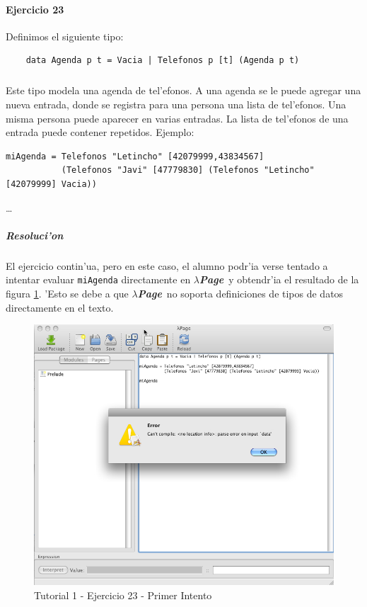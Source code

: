 \documentclass[a4paper]{article}
\newcommand{\hpage}{\textbf{\textsl{$\lambda$Page}}}
\begin{document}
\newpage
\paragraph{Ejercicio 23}Definimos el siguiente tipo:
\begin{center}\begin{lstlisting}
	data Agenda p t = Vacia | Telefonos p [t] (Agenda p t)
\end{lstlisting}\end{center}
\subparagraph{}Este tipo modela una agenda de tel'efonos.  A una agenda se le puede agregar una nueva entrada, donde se registra para una persona una lista de tel'efonos.  Una misma persona puede aparecer en varias entradas.  La lista de tel'efonos de una entrada puede contener repetidos.  Ejemplo:
\begin{center}\begin{lstlisting}
miAgenda = Telefonos "Letincho" [42079999,43834567] 
           (Telefonos "Javi" [47779830] (Telefonos "Letincho" [42079999] Vacia)) 
\end{lstlisting}\end{center}
\ldots
\subparagraph{Resoluci'on}El ejercicio contin'ua, pero en este caso, el alumno podr'ia verse tentado a intentar evaluar \texttt{miAgenda} directamente en \hpage\ y obtendr'ia el resultado de la figura \ref{tut109}.  'Esto se debe a que \hpage\ no soporta definiciones de tipos de datos directamente en el texto.
\begin{figure}[hp]
	\begin{center}
        	\includegraphics[width=.75\textwidth]{pictures/tut1/09}
		\caption{Tutorial 1 - Ejercicio 23 - Primer Intento}
		\label{tut109}
	\end{center}
\end{figure}
\end{document}
